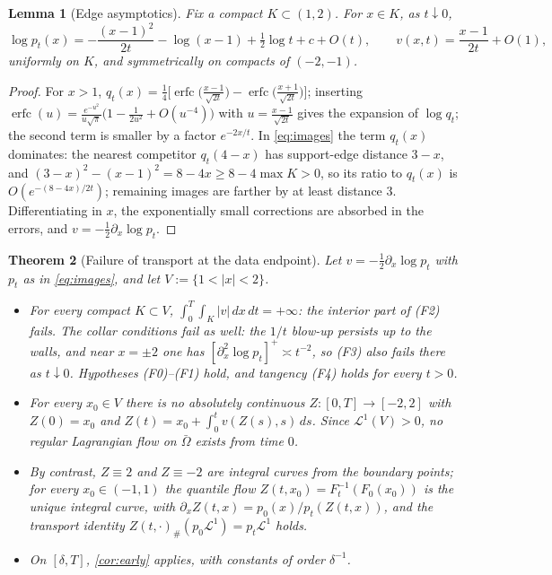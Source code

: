 \documentclass[11pt]{amsart}
\newtheorem{theorem}{Theorem}[section]
\newtheorem{lemma}[theorem]{Lemma}
\theoremstyle{definition}
\newcommand{\LL}[1]{\mathcal{L}^{#1}}
\newcommand{\dd}{\,d}
\begin{document}
\begin{lemma}[Edge asymptotics]\label{lem:asymp}
Fix a compact $K\subset(1,2)$. For $x\in K$, as $t\downarrow0$,
\[
\log p_t(x)=-\frac{(x-1)^2}{2t}-\log(x-1)+\tfrac12\log t+c+O(t),
\qquad
v(x,t)=\frac{x-1}{2t}+O(1),
\]
uniformly on $K$, and symmetrically on compacts of $(-2,-1)$.
\end{lemma}

\begin{proof}
For $x>1$, $q_t(x)=\tfrac14\big[\operatorname{erfc}\big(\tfrac{x-1}
{\sqrt{2t}}\big)-\operatorname{erfc}\big(\tfrac{x+1}{\sqrt{2t}}\big)
\big]$; inserting
$\operatorname{erfc}(u)=\tfrac{e^{-u^2}}{u\sqrt{\pi}}\big(1-
\tfrac1{2u^2}+O(u^{-4})\big)$ with $u=\tfrac{x-1}{\sqrt{2t}}$ gives
the expansion of $\log q_t$; the second term is smaller by a factor
$e^{-2x/t}$. In \eqref{eq:images} the term $q_t(x)$ dominates: the
nearest competitor $q_t(4-x)$ has support-edge distance $3-x$, and
$(3-x)^2-(x-1)^2=8-4x\ge8-4\max K>0$, so its ratio to $q_t(x)$ is
$O(e^{-(8-4x)/2t})$; remaining images are farther by at least
distance $3$. Differentiating in $x$, the exponentially small
corrections are absorbed in the errors, and
$v=-\tfrac12\partial_x\log p_t$.
\end{proof}

\begin{theorem}[Failure of transport at the data endpoint]
\label{thm:datafail}
Let $v=-\tfrac12\partial_x\log p_t$ with $p_t$ as in
\eqref{eq:images}, and let $V:=\{1<|x|<2\}$.
\begin{itemize}
\item[(i)] For every compact $K\subset V$,
$\int_0^T\!\int_K|v|\dd x\dd t=+\infty$: the interior part of
\textup{(F2)} fails. The collar conditions fail as well: the $1/t$
blow-up persists up to the walls, and near $x=\pm2$ one has
$[\partial_x^2\log p_t]^+\asymp t^{-2}$, so \textup{(F3)} also fails
there as $t\downarrow0$. Hypotheses \textup{(F0)--(F1)} hold, and
tangency \textup{(F4)} holds for every $t>0$.
\item[(ii)] For every $x_0\in V$ there is no absolutely continuous
$Z:[0,T]\to[-2,2]$ with $Z(0)=x_0$ and
$Z(t)=x_0+\int_0^tv(Z(s),s)\dd s$. Since $\LL{1}(V)>0$, no regular
Lagrangian flow on $\bar\Omega$ exists from time $0$.
\item[(iii)] By contrast, $Z\equiv2$ and $Z\equiv-2$ \emph{are}
integral curves from the boundary points; for every $x_0\in(-1,1)$
the quantile flow $Z(t,x_0)=F_t^{-1}(F_0(x_0))$ is the unique
integral curve, with $\partial_xZ(t,x)=p_0(x)/p_t(Z(t,x))$, and the
transport identity $Z(t,\cdot)_\#(p_0\LL{1})=p_t\LL{1}$ holds.
\item[(iv)] On $[\delta,T]$, \ref{cor:early} applies, with
constants of order $\delta^{-1}$.
\end{itemize}
\end{theorem}
\end{document}
